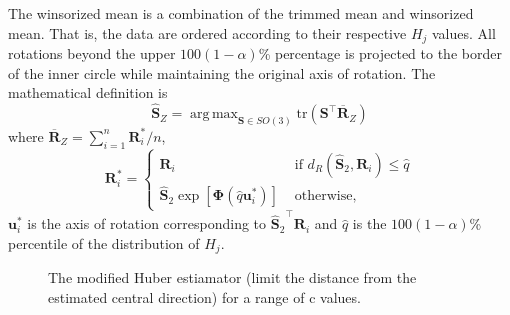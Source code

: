 \documentclass{article}\usepackage[]{graphicx}\usepackage[]{color}
\newenvironment{knitrout}{}{} %
\DeclareMathOperator*{\argmax}{arg\,max}
\newcommand{\ProjMean}{{\widehat{\bm S}_{2}}}
\newcommand{\WinzMean}{{\widehat{\bm S}_Z}}
\begin{document}
The winsorized mean is a combination of the trimmed mean and winsorized mean.  That is, the data are ordered according to their respective $H_j$ values.  All rotations beyond the upper $100(1-\alpha)$\% percentage is projected to the border of the inner circle while maintaining the original axis of rotation.  The mathematical definition is 
\[
\WinzMean=\argmax_{\bm S\in SO(3)}\text{tr}(\bm S^\top\overline{\bm R}_{Z})
\]
where $\overline{\bm R}_{Z}=\sum_{i=1}^n\bm R_i^*/n$, 
\[
\bm R_i^*=
\begin{cases}
\bm R_i&\text{ if }d_R(\ProjMean,\bm R_i)\leq\hat{q}\\
\ProjMean\exp[\bm{\Phi}(\hat{q}\bm{u}_i^*)]&\text{ otherwise,}
\end{cases}
\]
$\bm u_i^*$ is the axis of rotation corresponding to $\ProjMean^\top\bm R_i$ and $\hat{q}$ is the $100(1-\alpha)$\% percentile of the distribution of $H_j$.


% 

\begin{knitrout}
\color{fgcolor}









\begin{figure}[]


{\centering {}

}

\caption[The modified Huber estiamator (limit the distance from the estimated central direction) for a range of c values]{The modified Huber estiamator (limit the distance from the estimated central direction) for a range of c values.\label{fig:huberContd}}
\end{figure}


\end{knitrout}
\end{document}
